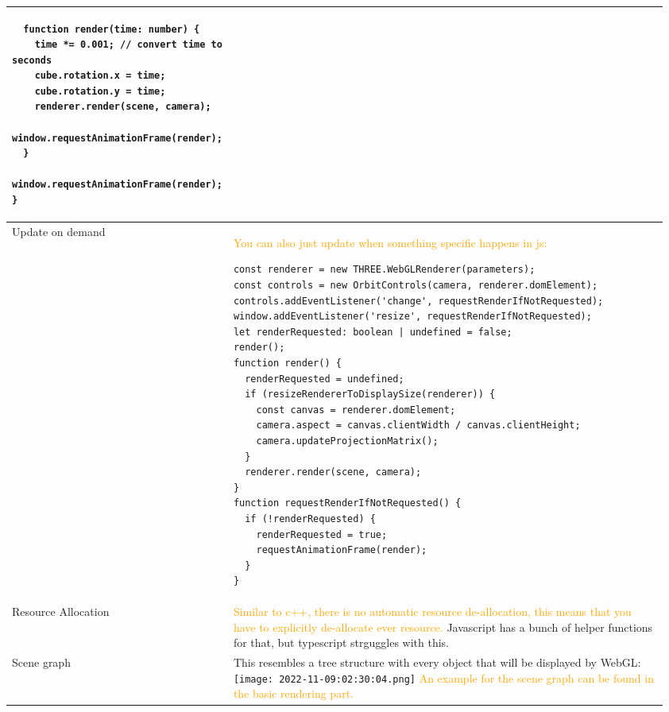 \documentclass[main.tex,fontsize=8pt,paper=a4,paper=portrait,DIV=calc,]{scrartcl}
\begin{document}
\begin{table}[ht!]
\begin{tabular}{|m{0.2\linewidth}|m{0.755\linewidth}|}
\begin{lstlisting}
  function render(time: number) {
    time *= 0.001; // convert time to seconds
    cube.rotation.x = time;
    cube.rotation.y = time;
    renderer.render(scene, camera);
    window.requestAnimationFrame(render);
  }
  window.requestAnimationFrame(render);
}
\end{lstlisting}\\
\hline
Update on demand & 
\textcolor{orange}{You can also just update when something specific happens in js:}\newline
\begin{lstlisting}
const renderer = new THREE.WebGLRenderer(parameters);
const controls = new OrbitControls(camera, renderer.domElement);
controls.addEventListener('change', requestRenderIfNotRequested);
window.addEventListener('resize', requestRenderIfNotRequested);
let renderRequested: boolean | undefined = false;
render();
function render() {
  renderRequested = undefined;
  if (resizeRendererToDisplaySize(renderer)) {
    const canvas = renderer.domElement;
    camera.aspect = canvas.clientWidth / canvas.clientHeight;
    camera.updateProjectionMatrix();
  }
  renderer.render(scene, camera);
}
function requestRenderIfNotRequested() {
  if (!renderRequested) {
    renderRequested = true;
    requestAnimationFrame(render);
  }
}
\end{lstlisting}\\
\hline
Resource Allocation & 
\textcolor{orange}{Similar to c++, there is no automatic resource de-allocation, this means that you have to explicitly de-allocate ever resource.}\newline 
Javascript has a bunch of helper functions for that, but typescript strguggles with this.\\
\hline
Scene graph & 
This resembles a tree structure with every object that will be displayed by WebGL:\newline
\texttt{[image: 2022-11-09:02:30:04.png]}\newline
\textcolor{orange}{An example for the scene graph can be found in the basic rendering part.}\\
\hline
\end{tabular}
\end{table}
\pagebreak
\begin{table}[ht!]
\section{}
\begin{tabular}{|m{0.2\linewidth}|m{0.755\linewidth}|}
\hline

\hline
\end{tabular}
\end{table}
\end{document}
